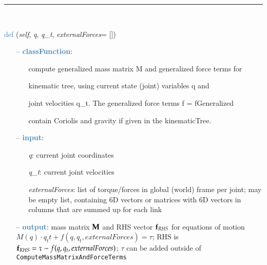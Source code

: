 \begin{itemize}[leftmargin=1.4cm]
\begin{itemize}[leftmargin=0.5cm]
\begin{itemize}[leftmargin=1.4cm]
\begin{itemize}[leftmargin=0.5cm]
\begin{itemize}[leftmargin=1.4cm]
\begin{itemize}[leftmargin=0.5cm]
\begin{itemize}[leftmargin=1.4cm]
\begin{itemize}[leftmargin=1.4cm]
\begin{itemize}[leftmargin=1.4cm]
%
\noindent\rule{8cm}{0.75pt}\vspace{1pt} \\ 
\begin{flushleft}
\noindent \textcolor{steelblue}{def {\bf {}}}\label{sec:kinematicTree:KinematicTree:ComputeMassMatrixAndForceTerms}
({\it self}, {\it q}, {\it q\_t}, {\it externalForces}= [])
\end{flushleft}
\setlength{\itemindent}{0.7cm}
\begin{itemize}[leftmargin=0.7cm]
  \item[--]  \textcolor{steelblue}{\bf classFunction}: \vspace{-6pt}
  \begin{itemize}[leftmargin=1.2cm]
\setlength{\itemindent}{-0.7cm}
    \item[] compute generalized mass matrix M and generalized force terms for
    \item[]             kinematic tree, using current state (joint) variables q and
    \item[]             joint velocities q\_t. The generalized force terms f = fGeneralized
    \item[]             contain Coriolis and gravity if given in the kinematicTree.
  \end{itemize}
  \item[--]  \textcolor{steelblue}{\bf input}: \vspace{-6pt}
  \begin{itemize}[leftmargin=1.2cm]
\setlength{\itemindent}{-0.7cm}
    \item[] {\it q}: current joint coordinates
    \item[] {\it   q\_t}: current joint velocities
    \item[] {\it   externalForces}: list of torque/forces in global (world) frame per joint; may be empty list, containing 6D vectors or matrices with 6D vectors in columns that are summed up for each link
  \end{itemize}
  \item[--]  \textcolor{steelblue}{\bf output}: mass matrix $\mathbf{M}$ and RHS vector $\mathbf{f}_{RHS}$ for equations of motion $M(q) \cdot q_tt + f(q,q_t,externalForces) = \tau$; RHS is $\mathbf{f}_{RHS}=\tau - f(q,q_t,externalForces)$; $\tau$ can be added outside of \texttt{ComputeMassMatrixAndForceTerms}\vspace{12pt}\end{itemize}

\end{itemize}
\end{itemize}
\end{itemize}
\end{itemize}
\end{itemize}
\end{itemize}
\end{itemize}
\end{itemize}
\end{itemize}
